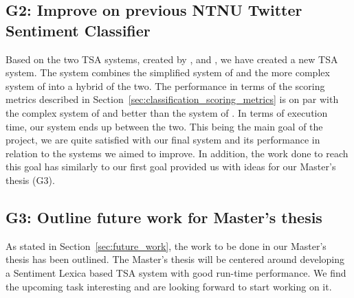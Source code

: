 \subsection*{G2: Improve on previous NTNU Twitter Sentiment Classifier}
Based on the two TSA systems, created by \cite{SelmerBrevik}, and \cite{FaretReitan}, we have created a new TSA system. The system combines the simplified system of \cite{SelmerBrevik} and the more complex system of \cite{FaretReitan} into a hybrid of the two. The performance in terms of the scoring metrics described in Section~\ref{sec:classification_scoring_metrics} is on par with the complex system of \cite{FaretReitan} and better than the system of \cite{SelmerBrevik}. In terms of execution time, our system ends up between the two. This being the main goal of the project, we are quite satisfied with our final system and its performance in relation to the systems we aimed to improve. In addition, the work done to reach this goal has similarly to our first goal provided us with ideas for our Master's thesis (G3).    

\subsection*{G3: Outline future work for Master's thesis}
As stated in Section~\ref{sec:future_work}, the work to be done in our Master's thesis has been outlined. The Master's thesis will be centered around developing a Sentiment Lexica based TSA system with good run-time performance. We find the upcoming task interesting and are looking forward to start working on it.




